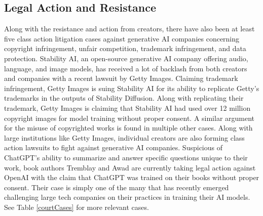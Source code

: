\documentclass[manuscript,screen]{acmart}
\begin{document}
\subsection{Legal Action and Resistance}
Along with the resistance and action from creators, there have also been at least five class action litigation cases against generative AI companies concerning copyright infringement, unfair competition, trademark infringement, and data protection. Stability AI, an open-source generative AI company offering audio, language, and image models, has received a lot of backlash from both creators and companies with a recent lawsuit by Getty Images. Claiming trademark infringement, Getty Images is suing Stability AI for its ability to replicate Getty’s trademarks in the outputs of Stability Diffusion. Along with replicating their trademark, Getty Images is claiming that Stability AI had used over 12 million copyright images for model training without proper consent. A similar argument for the misuse of copyrighted works is found in multiple other cases. Along with large institutions like Getty Images, individual creators are also forming class action lawsuits to fight against generative AI companies. Suspicious of ChatGPT’s ability to summarize and answer specific questions unique to their work, book authors Tremblay and Awad are currently taking legal action against OpenAI with the claim that ChatGPT was trained on their books without proper consent. Their case is simply one of the many that has recently emerged challenging large tech companies on their practices in training their AI models. See Table \ref{courtCases} for more relevant cases. 
\end{document}
